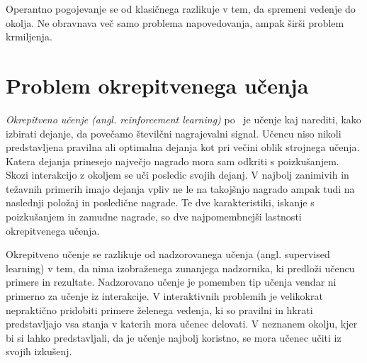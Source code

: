 \documentclass[a4paper, oneside, 12pt]{report}
\begin{document}
Operantno pogojevanje se od klasičnega razlikuje v tem, da spremeni vedenje do okolja. Ne obravnava več samo problema napovedovanja, ampak širši problem krmiljenja.

\chapter{Problem okrepitvenega učenja} \label{chapter:Problem}
\thispagestyle{fancy}
{\em Okrepitveno učenje (angl. reinforcement learning)} po~\cite{ReinforcementLearningAnIntroduction} je učenje kaj narediti, kako izbirati dejanje, da povečamo številčni nagrajevalni signal. Učencu niso nikoli predstavljena pravilna ali optimalna dejanja kot pri večini oblik strojnega učenja. Katera dejanja prinesejo največjo nagrado mora sam odkriti s poizkušanjem. Skozi interakcijo z okoljem se uči posledic svojih dejanj. V najbolj zanimivih in težavnih primerih imajo dejanja vpliv ne le na takojšnjo nagrado ampak tudi na naslednji položaj in posledične nagrade. Te dve karakteristiki, iskanje s poizkušanjem in zamudne nagrade, so dve najpomembnejši lastnosti okrepitvenega učenja.


Okrepitveno učenje se razlikuje od nadzorovanega učenja (angl. supervised learning) v tem, da nima izobraženega zunanjega nadzornika, ki predloži učencu primere in rezultate. Nadzorovano učenje je pomemben tip učenja vendar ni primerno za učenje iz interakcije. V interaktivnih problemih je velikokrat nepraktično pridobiti primere želenega vedenja, ki so pravilni in hkrati predstavljajo vsa stanja v katerih mora učenec delovati. V neznanem okolju, kjer bi si lahko predstavljali, da je učenje najbolj koristno, se mora učenec učiti iz svojih izkušenj.
\end{document}
